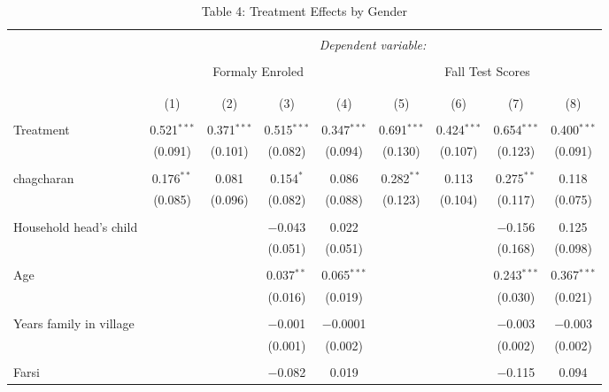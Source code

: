 \documentclass[
]{article}
\begin{document}
\begin{table}[!htbp] \centering 
  \caption{Table 4: Treatment Effects by Gender} 
  \label{} 
\small 
\begin{tabular}{@{\extracolsep{-15pt}}lcccccccc} 
\\[-1.8ex]\hline 
\hline \\[-1.8ex] 
 & \multicolumn{8}{c}{\textit{Dependent variable:}} \\ 
\cline{2-9} 
\\[-1.8ex] & \multicolumn{4}{c}{Formaly Enroled} & \multicolumn{4}{c}{Fall Test Scores} \\ 
 &        &        &        &        &        &        &        &        \\ 
\\[-1.8ex] & (1) & (2) & (3) & (4) & (5) & (6) & (7) & (8)\\ 
\hline \\[-1.8ex] 
 Treatment & 0.521$^{***}$ & 0.371$^{***}$ & 0.515$^{***}$ & 0.347$^{***}$ & 0.691$^{***}$ & 0.424$^{***}$ & 0.654$^{***}$ & 0.400$^{***}$ \\ 
  & (0.091) & (0.101) & (0.082) & (0.094) & (0.130) & (0.107) & (0.123) & (0.091) \\ 
  & & & & & & & & \\ 
 chagcharan & 0.176$^{**}$ & 0.081 & 0.154$^{*}$ & 0.086 & 0.282$^{**}$ & 0.113 & 0.275$^{**}$ & 0.118 \\ 
  & (0.085) & (0.096) & (0.082) & (0.088) & (0.123) & (0.104) & (0.117) & (0.075) \\ 
  & & & & & & & & \\ 
 Household head's child &  &  & $-$0.043 & 0.022 &  &  & $-$0.156 & 0.125 \\ 
  &  &  & (0.051) & (0.051) &  &  & (0.168) & (0.098) \\ 
  & & & & & & & & \\ 
 Age &  &  & 0.037$^{**}$ & 0.065$^{***}$ &  &  & 0.243$^{***}$ & 0.367$^{***}$ \\ 
  &  &  & (0.016) & (0.019) &  &  & (0.030) & (0.021) \\ 
  & & & & & & & & \\ 
 Years family in village &  &  & $-$0.001 & $-$0.0001 &  &  & $-$0.003 & $-$0.003 \\ 
  &  &  & (0.001) & (0.002) &  &  & (0.002) & (0.002) \\ 
  & & & & & & & & \\ 
 Farsi &  &  & $-$0.082 & 0.019 &  &  & $-$0.115 & 0.094 \\ 

\end{tabular}
\end{table}
\end{document}
